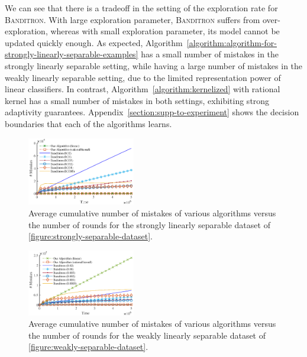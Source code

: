 We can see that there is a tradeoff in the setting of the exploration rate for
\textsc{Banditron}. With large exploration parameter, \textsc{Banditron} suffers
from over-exploration, whereas with small exploration parameter, its model
cannot be updated quickly enough. As expected,
Algorithm~\ref{algorithm:algorithm-for-strongly-linearly-separable-examples} has
a small number of mistakes in the strongly linearly separable setting, while
having a large number of mistakes in the weakly linearly separable setting, due
to the limited representation power of linear classifiers. In contrast,
Algorithm~\ref{algorithm:kernelized} with rational kernel has a small number of
mistakes in both settings, exhibiting strong adaptivity guarantees.
Appendix~\ref{section:supp-to-experiment} shows the decision boundaries that
each of the algorithms learns.

\begin{figure}
\centering
\includegraphics[width=0.42\textwidth]{figures/strong3}
\caption{Average cumulative number of mistakes of various algorithms versus the
number of rounds for the strongly linearly separable dataset of
\autoref{figure:strongly-separable-dataset}.}
\label{figure:number-of-mistakes-strongly-separable-dataset}
\end{figure}

\begin{figure}
\centering
\includegraphics[width=0.42\textwidth]{figures/weak3}
\caption{Average cumulative number of mistakes of various algorithms versus the
number of rounds for the weakly linearly separable dataset of
\autoref{figure:weakly-separable-dataset}.}
\label{figure:number-of-mistakes-weakly-separable-dataset}
\end{figure}

